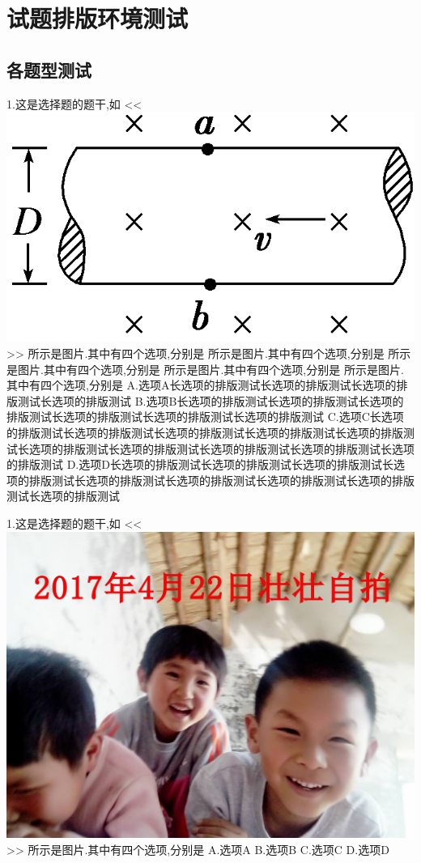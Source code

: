 \documentclass[a4paper,fontset = windowsnew]{ctexbook}
\begin{document}

\chapter{试题排版环境测试}

\section{各题型测试}


\begin{choices}
  1.这是选择题的题干,如
  <<
  \includegraphics{1.png}
  >>
  所示是图片.其中有四个选项,分别是
  所示是图片.其中有四个选项,分别是
  所示是图片.其中有四个选项,分别是
  所示是图片.其中有四个选项,分别是
  所示是图片.其中有四个选项,分别是
  A.选项A长选项的排版测试长选项的排版测试长选项的排版测试长选项的排版测试
  B.选项B长选项的排版测试长选项的排版测试长选项的排版测试长选项的排版测试长选项的排版测试长选项的排版测试
  C.选项C长选项的排版测试长选项的排版测试长选项的排版测试长选项的排版测试长选项的排版测试长选项的排版测试长选项的排版测试长选项的排版测试长选项的排版测试长选项的排版测试
  D.选项D长选项的排版测试长选项的排版测试长选项的排版测试长选项的排版测试长选项的排版测试长选项的排版测试长选项的排版测试长选项的排版测试长选项的排版测试

  1.这是选择题的题干,如
  <<
  \includegraphics[scale=0.2]{2.jpg}
  >>
  所示是图片.其中有四个选项,分别是
  A.选项A
  B.选项B
  C.选项C
  D.选项D


\end{choices}
\end{document}
